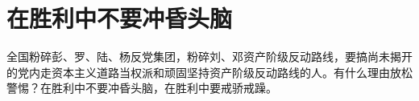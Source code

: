\section[在胜利中不要冲昏头脑（一九六七年三月）]{在胜利中不要冲昏头脑}


全国粉碎彭、罗、陆、杨反党集团，粉碎刘、邓资产阶级反动路线，要搞尚未揭开的党内走资本主义道路当权派和顽固坚持资产阶级反动路线的人。有什么理由放松警惕？在胜利中不要冲昏头脑，在胜利中要戒骄戒躁。


